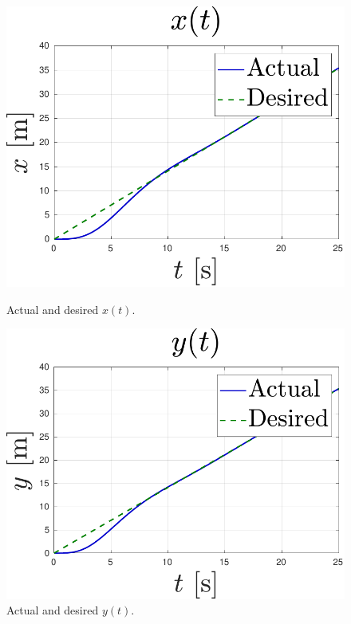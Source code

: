 \documentclass[main]{subfiles}
\begin{document}
\begin{figure}
    \centering
    \begin{minipage}[b]{0.45\textwidth}
        \centering
        \includegraphics[width=\textwidth]{images/pid_x.pdf}
        \caption[Tracking in X-axis]{Actual and desired $x(t)$.}
        \label{fig:pid_x}
    \end{minipage}
    \begin{minipage}[b]{0.45\textwidth}
        \centering
        \includegraphics[width=\textwidth]{images/pid_y.pdf}
        \caption[Tracking in Y-axis]{Actual and desired $y(t)$.}

\end{minipage}
\end{figure}
\end{document}
